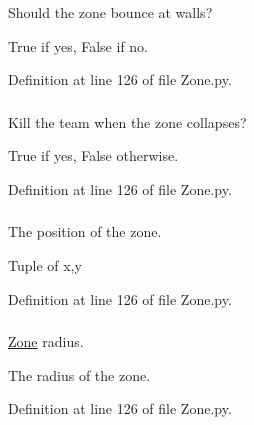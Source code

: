 \-Should the zone bounce at walls? 

\-True if yes, \-False if no. 

\-Definition at line 126 of file \-Zone.\-py.

\hypertarget{class_zone_1_1_zone_a583bc681c535d3dd054dad0cfbad196e}{
\subsubsection[{killteam}]{}}
\label{class_zone_1_1_zone_a583bc681c535d3dd054dad0cfbad196e}


\-Kill the team when the zone collapses? 

\-True if yes, \-False otherwise. 

\-Definition at line 126 of file \-Zone.\-py.

\hypertarget{class_zone_1_1_zone_a5f5682287ad00b6437fd781c64243a72}{
\subsubsection[{position}]{}}
\label{class_zone_1_1_zone_a5f5682287ad00b6437fd781c64243a72}


\-The position of the zone. 

\-Tuple of x,y 

\-Definition at line 126 of file \-Zone.\-py.

\hypertarget{class_zone_1_1_zone_a537406dc6f09d6f6d38ab88b752af1ea}{
\subsubsection[{radius}]{}}
\label{class_zone_1_1_zone_a537406dc6f09d6f6d38ab88b752af1ea}


\hyperlink{class_zone_1_1_zone}{\-Zone} radius. 

\-The radius of the zone. 

\-Definition at line 126 of file \-Zone.\-py.

\hypertarget{class_zone_1_1_zone_aca8cae5b57b366e26f69aad292c016f1}{
\subsubsection[{settings}]{}}
\label{class_zone_1_1_zone_aca8cae5b57b366e26f69aad292c016f1}


